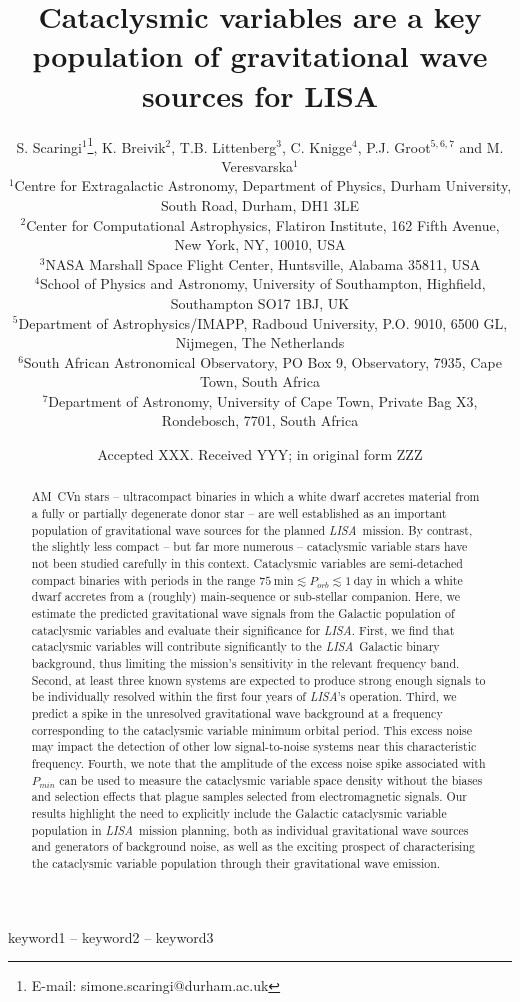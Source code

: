 \documentclass[fleqn,usenatbib]{mnras}
\title[LISA CVs]{Cataclysmic variables are a key population of gravitational wave sources for LISA}
\author[S. Scaringi et al.]{
S. Scaringi$^{1}$\thanks{E-mail: simone.scaringi@durham.ac.uk},
K. Breivik$^{2}$,
T.B. Littenberg$^{3}$,
C. Knigge$^{4}$,
P.J. Groot$^{5,6,7}$ and
M. Veresvarska$^{1}$
\\
$^{1}$Centre for Extragalactic Astronomy, Department of Physics, Durham University, South Road, Durham, DH1 3LE\\
$^{2}$Center for Computational Astrophysics, Flatiron Institute, 162 Fifth Avenue, New York, NY, 10010, USA\\
$^{3}$NASA Marshall Space Flight Center, Huntsville, Alabama 35811, USA\\
$^{4}$School of Physics and Astronomy, University of Southampton, Highfield, Southampton SO17 1BJ, UK\\
$^{5}$Department of Astrophysics/IMAPP, Radboud University, P.O. 9010, 6500 GL, Nijmegen, The Netherlands\\
$^{6}$South African Astronomical Observatory, PO Box 9, Observatory, 7935, Cape Town, South Africa\\
$^{7}$Department of Astronomy, University of Cape Town, Private Bag X3, Rondebosch, 7701, South Africa\\
}
\date{Accepted XXX. Received YYY; in original form ZZZ}
\newcommand{\lisa}{{\it LISA}}
\begin{document}
\maketitle

\begin{abstract}
AM~CVn stars -- ultracompact binaries in which a white dwarf accretes material from a fully or partially degenerate donor star -- are well established as an important population of gravitational wave sources for the planned \lisa\ mission. By contrast, the slightly less compact -- but far more numerous -- cataclysmic variable stars have not been studied carefully in this context. Cataclysmic variables are semi-detached compact binaries with periods in the range $75~\mathrm{min} \lesssim P_{orb} \lesssim 1~\mathrm{day}$ in which a white dwarf accretes from a (roughly) main-sequence or sub-stellar companion. Here, we estimate the predicted gravitational wave signals from the Galactic population of cataclysmic variables and evaluate their significance for \lisa. First, we find that cataclysmic variables will contribute significantly to the \lisa\ Galactic binary background, thus limiting the mission's sensitivity in the relevant frequency band. Second, at least three known systems are expected to produce strong enough signals to be individually resolved within the first four years of \lisa's operation. Third, we predict a spike in the unresolved gravitational wave background at a frequency corresponding to the cataclysmic variable minimum orbital period. This excess noise may impact the detection of other low signal-to-noise systems near this characteristic frequency. Fourth, we note that the amplitude of the excess noise spike associated with $P_{min}$ can be used to measure the cataclysmic variable space density without the biases and selection effects that plague samples selected from  electromagnetic signals. Our results highlight the need to explicitly include the Galactic cataclysmic variable population in \lisa\ mission planning, both as individual gravitational wave sources and generators of background noise, as well as the exciting prospect of characterising the cataclysmic variable population through their gravitational wave emission.
\end{abstract}


\begin{keywords}
keyword1 -- keyword2 -- keyword3
\end{keywords}
\end{document}
